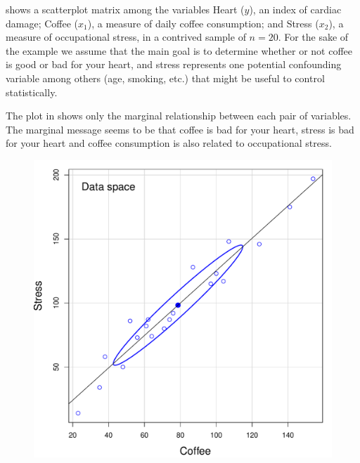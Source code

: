  shows a scatterplot matrix among the variables
Heart ($y$), an index of cardiac damage; Coffee ($x_1$), a measure of daily
coffee consumption; and Stress ($x_2$), a measure of occupational stress, in a contrived
sample of $n=20$. For the sake of the example we assume that the main goal is
to determine whether or not coffee is good or bad for your heart, and stress
represents one potential confounding variable among others (age, smoking, etc.)
that might be useful to control statistically.

The plot in  shows only the marginal relationship
between each pair of variables. The marginal message seems to be that coffee is
bad for your heart, stress is bad for your heart and coffee consumption is
also related to occupational stress.
\begin{figure}[htb]
  \begin{minipage}[c]{.485\textwidth}
   \includegraphics[width=1\linewidth,clip]{fig/vis-reg-coffee12a}
   \end{minipage}%
  \hfill
  \begin{minipage}[c]{.485\textwidth}

\end{minipage}
\end{figure}
